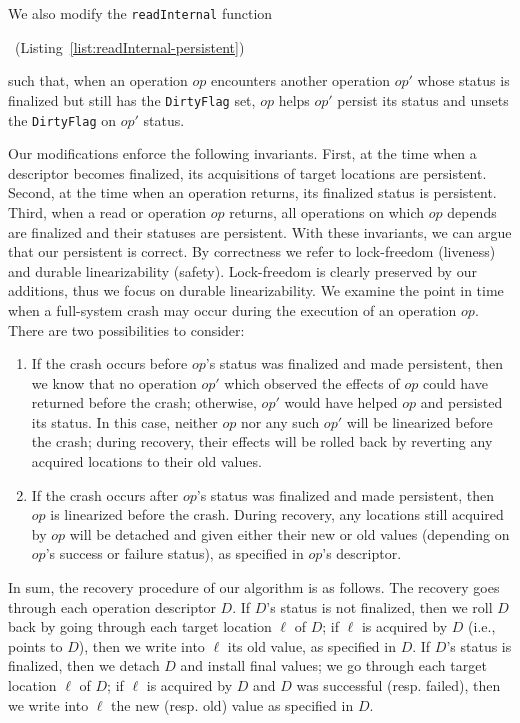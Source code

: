 We also modify the \texttt{readInternal} function\begin{camera}\end{camera}\begin{arxiv}~(Listing~\ref{list:readInternal-persistent})\end{arxiv} such that, when an operation $op$ encounters another operation $op'$ whose status is finalized but still has the \texttt{DirtyFlag} set, $op$ helps $op'$ persist its status and unsets the \texttt{DirtyFlag} on $op'$ status.

Our modifications enforce the following invariants. First, at the time when a descriptor becomes finalized, its acquisitions of target locations are persistent. Second, at the time when an \mcas{} operation returns, its finalized status is persistent. Third, when a read or \mcas{} operation $op$ returns, all operations on which $op$ depends are finalized and their statuses are persistent. With these invariants, we can argue that our persistent \mcas{} is correct. By correctness we refer to lock-freedom (liveness) and durable linearizability (safety). Lock-freedom is clearly preserved by our additions, thus we focus on durable linearizability. We examine the point in time when a full-system crash may occur during the execution of an \mcas{} operation $op$. There are two possibilities to consider:
\begin{enumerate}
    \item If the crash occurs before $op$'s status was finalized and made persistent, then we know that no operation $op'$ which observed the effects of $op$ could have returned before the crash; otherwise, $op'$ would have helped $op$ and persisted its status. In this case, neither $op$ nor any such $op'$ will be linearized before the crash; during recovery, their effects will be rolled back by reverting any acquired locations to their old values.
    \item If the crash occurs after $op$'s status was finalized and made persistent, then $op$ is linearized before the crash. During recovery, any locations still acquired by $op$ will be detached and given either their new or old values (depending on $op$'s success or failure status), as specified in $op$'s descriptor.
\end{enumerate}

In sum, the recovery procedure of our algorithm is as follows. The recovery goes through each operation descriptor $D$. If $D$'s status is not finalized, then we roll $D$ back by going through each target location $\ell$ of $D$; if $\ell$ is acquired by $D$ (i.e., points to $D$), then we write into $\ell$ its old value, as specified in $D$. If $D$'s status is finalized, then we detach $D$ and install final values; we go through each target location $\ell$ of $D$; if $\ell$ is acquired by $D$ and $D$ was successful (resp. failed), then we write into $\ell$ the new (resp. old) value as specified in $D$.